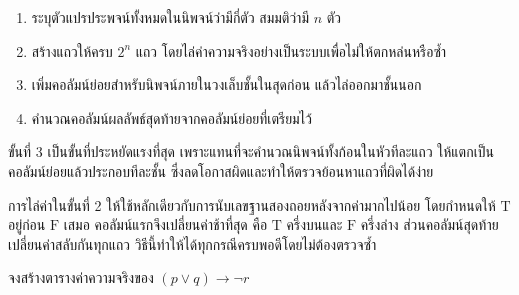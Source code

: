 \begin{principle}
\label{prin:build-truth-table}
\begin{enumerate}
    \item ระบุตัวแปรประพจน์ทั้งหมดในนิพจน์ว่ามีกี่ตัว สมมติว่ามี $n$ ตัว
    \item สร้างแถวให้ครบ $2^n$ แถว โดยไล่ค่าความจริงอย่างเป็นระบบเพื่อไม่ให้ตกหล่นหรือซ้ำ
    \item เพิ่มคอลัมน์ย่อยสำหรับนิพจน์ภายในวงเล็บชั้นในสุดก่อน แล้วไล่ออกมาชั้นนอก
    \item คำนวณคอลัมน์ผลลัพธ์สุดท้ายจากคอลัมน์ย่อยที่เตรียมไว้
\end{enumerate}
ขั้นที่ 3 เป็นขั้นที่ประหยัดแรงที่สุด เพราะแทนที่จะคำนวณนิพจน์ทั้งก้อนในหัวทีละแถว ให้แตกเป็นคอลัมน์ย่อยแล้วประกอบทีละชั้น ซึ่งลดโอกาสผิดและทำให้ตรวจย้อนหาแถวที่ผิดได้ง่าย
\end{principle}

การไล่ค่าในขั้นที่ 2 ให้ใช้หลักเดียวกับการนับเลขฐานสองถอยหลังจากค่ามากไปน้อย โดยกำหนดให้ $\text{T}$ อยู่ก่อน $\text{F}$ เสมอ คอลัมน์แรกจึงเปลี่ยนค่าช้าที่สุด คือ $\text{T}$ ครึ่งบนและ $\text{F}$ ครึ่งล่าง ส่วนคอลัมน์สุดท้ายเปลี่ยนค่าสลับกันทุกแถว วิธีนี้ทำให้ได้ทุกกรณีครบพอดีโดยไม่ต้องตรวจซ้ำ

\begin{ex}
\label{ex:build-truth-table}
จงสร้างตารางค่าความจริงของ $(p \lor q) \rightarrow \neg r$
\end{ex}


